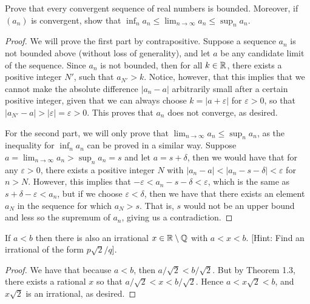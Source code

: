 \begin{exercise}{6}
Prove that every convergent sequence of real numbers is bounded. Moreover, if $(a_n)$ is convergent, show that $\inf_na_n\leq \lim_{n\to\infty}a_n\leq\sup_na_n$.
\end{exercise}
\begin{proof}
We will prove the first part by contrapositive. Suppose a sequence $a_n$ is not bounded above (without loss of generality), and let $a$ be any candidate limit of the sequence. Since $a_n$ is not bounded, then for all $k\in\mathbb{R}$, there exists a positive integer $N'$, such that $a_{N'}>k$. Notice, however, that this implies that we cannot make the absolute difference $\lvert a_n-a\rvert$ arbitrarily small after a certain positive integer, given that we can always choose $k=\lvert a+\varepsilon\rvert$ for $\varepsilon>0$, so that $\lvert a_{N'}-a\rvert >\lvert \varepsilon\rvert= \varepsilon> 0$. This proves that $a_n$ does not converge, as desired.

For the second part, we will only prove that $\lim_{n\to\infty}a_n\leq\sup_na_n$, as the inequality for $\inf_na_n$ can be proved in a similar way. Suppose $a=\lim_{n\to\infty}a_n> \sup_na_n=s$ and let $a=s+\delta$, then we would have that for any $\varepsilon>0$, there exists a positive integer $N$ with $\lvert a_n-a\rvert <\lvert a_n-s-\delta\rvert< \varepsilon$ for $n>N$. However, this implies that $-\varepsilon< a_n-s-\delta<\varepsilon$, which is the same as $s+\delta-\varepsilon<a_n$, but if we choose $\varepsilon<\delta$, then we have that there exists an element $a_N$ in the sequence for which $a_N>s$. That is, $s$ would not be an upper bound and less so the supremum of $a_n$, giving us a contradiction.
\end{proof}

\begin{exercise}{7}
If $a<b$ then there is also an irrational $x\in\mathbb{R}\setminus\mathbb{Q}$ with $a<x<b$. [Hint: Find an irrational of the form $p\sqrt{2}/q$].
\end{exercise}
\begin{proof}
 We have that because $a<b$, then $a/\sqrt{2}<b/\sqrt{2}$. But by Theorem 1.3, there exists a rational $x$ so that $a/\sqrt{2}<x<b/\sqrt{2}$. Hence $a<x\sqrt{2}<b$, and $x\sqrt{2}$ is an irrational, as desired.
\end{proof}

